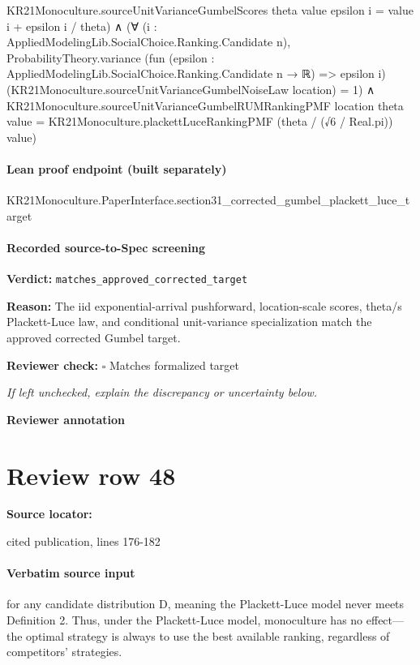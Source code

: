 \documentclass[10pt]{article}
\newcommand{\reviewerbox}{%
  \par\noindent\fbox{\parbox{0.96\linewidth}{\rule{0pt}{0.38in}}}\par
}
\newcommand{\reviewmatch}[1]{%
  \par\noindent\textbf{Reviewer check:} $\square$\; #1\par
  \noindent\emph{If left unchecked, explain the discrepancy or uncertainty below.}\par
}
\begin{document}
\begin{ReviewVerbatim}
                    KR21Monoculture.sourceUnitVarianceGumbelScores theta value epsilon i =
                      value i + epsilon i / theta) ∧
                  (∀ (i : AppliedModelingLib.SocialChoice.Ranking.Candidate n),
                      ProbabilityTheory.variance
                          (fun (epsilon : AppliedModelingLib.SocialChoice.Ranking.Candidate n → ℝ) => epsilon i)
                          (KR21Monoculture.sourceUnitVarianceGumbelNoiseLaw location) =
                        1) ∧
                    KR21Monoculture.sourceUnitVarianceGumbelRUMRankingPMF location theta value =
                      KR21Monoculture.plackettLuceRankingPMF (theta / (√6 / Real.pi)) value)
\end{ReviewVerbatim}

\paragraph{Lean proof endpoint (built separately)}\begin{ReviewVerbatim}
KR21Monoculture.PaperInterface.section31_corrected_gumbel_plackett_luce_target
\end{ReviewVerbatim}

\paragraph{Recorded source-to-Spec screening}
\textbf{Verdict:} \texttt{matches\_approved\_corrected\_target}
\\
{\raggedright
\textbf{Reason:} The iid exponential-\allowbreak{}arrival pushforward, location-\allowbreak{}scale scores, theta/\allowbreak{}s Plackett-\allowbreak{}Luce law, and conditional unit-\allowbreak{}variance specialization match the approved corrected Gumbel target.\allowbreak{}
\par}
\reviewmatch{Matches formalized target}
\noindent\textbf{Reviewer annotation}\par
\reviewerbox
\clearpage
\hypertarget{source-claim-e12ec3045f35c0cc}{}
\section*{Review row 48}
\textbf{Source locator:} {\footnotesize\raggedright cited publication, lines 176-\allowbreak{}182\par}
\paragraph{Verbatim source input}
\begin{ReviewVerbatim}
for any candidate distribution D, meaning the Plackett-Luce model never meets Definition 2. Thus, under
the Plackett-Luce model, monoculture has no effect—the optimal strategy is always to use the best available
ranking, regardless of competitors’ strategies.
\end{ReviewVerbatim}
\end{document}
